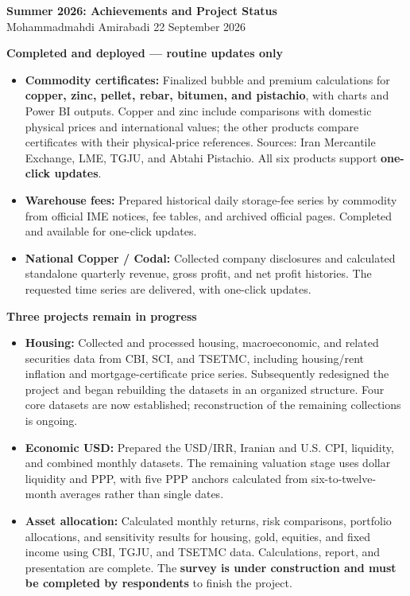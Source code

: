 \documentclass[11pt,a4paper]{article}
\begin{document}
\begin{center}
{\Large\bfseries\color{navy} Summer 2026: Achievements and Project Status}\\[4pt]
Mohammadmahdi Amirabadi \hfill 22 September 2026
\end{center}
\vspace{-4pt}

\textbf{\color{navy}Completed and deployed --- routine updates only}

\begin{itemize}
  \item \textbf{Commodity certificates:} Finalized bubble and premium calculations for \textbf{copper, zinc, pellet, rebar, bitumen, and pistachio}, with charts and Power BI outputs. Copper and zinc include comparisons with domestic physical prices and international values; the other products compare certificates with their physical-price references. Sources: Iran Mercantile Exchange, LME, TGJU, and Abtahi Pistachio. All six products support \textbf{one-click updates}.
  \item \textbf{Warehouse fees:} Prepared historical daily storage-fee series by commodity from official IME notices, fee tables, and archived official pages. Completed and available for one-click updates.
  \item \textbf{National Copper / Codal:} Collected company disclosures and calculated standalone quarterly revenue, gross profit, and net profit histories. The requested time series are delivered, with one-click updates.
\end{itemize}

\textbf{\color{navy}Three projects remain in progress}

\begin{itemize}
  \item \textbf{Housing:} Collected and processed housing, macroeconomic, and related securities data from CBI, SCI, and TSETMC, including housing/rent inflation and mortgage-certificate price series. Subsequently redesigned the project and began rebuilding the datasets in an organized structure. Four core datasets are now established; reconstruction of the remaining collections is ongoing.
  \item \textbf{Economic USD:} Prepared the USD/IRR, Iranian and U.S. CPI, liquidity, and combined monthly datasets. The remaining valuation stage uses dollar liquidity and PPP, with five PPP anchors calculated from six-to-twelve-month averages rather than single dates.
  \item \textbf{Asset allocation:} Calculated monthly returns, risk comparisons, portfolio allocations, and sensitivity results for housing, gold, equities, and fixed income using CBI, TGJU, and TSETMC data. Calculations, report, and presentation are complete. The \textbf{survey is under construction and must be completed by respondents} to finish the project.
\end{itemize}
\end{document}
